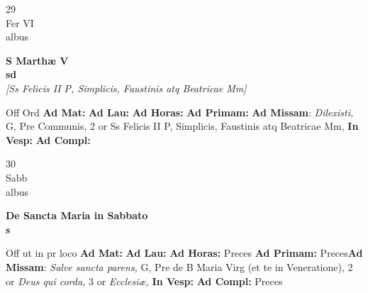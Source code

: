 \documentclass[10pt, openany]{book}
\begin{document}
    \begin{center}
        \begin{minipage}{3.5in}
            \vspace{2em}
            \begin{minipage}{0.5in}
                {\Huge 29} \\
                {\normalsize Fer VI} \\
                {\normalsize albus}
            \end{minipage}
            \begin{minipage}{3.0in}
                \textbf{ \large S Marthæ V \\
                \textnormal{\normalsize sd}} \\ \textit{[Ss Felicis II P, Simplicis, Faustinis atq Beatricae Mm]} \\ 
            \end{minipage}
            \begin{justify}Off Ord
                \textbf{Ad Mat: }
                \textbf{Ad Lau: }
                \textbf{Ad Horas: }
                \textbf{Ad Primam: }\textbf{Ad Missam}: \textit{Dilexisti,} G, Pre Communis, 2 or Ss Felicis II P, Simplicis, Faustinis atq Beatricae Mm,  
                \textbf{In Vesp: }
                \textbf{Ad Compl: }
            \end{justify}
        \end{minipage}
    \end{center}

    \begin{center}
        \begin{minipage}{3.5in}
            \vspace{2em}
            \begin{minipage}{0.5in}
                {\Huge 30} \\
                {\normalsize Sabb} \\
                {\normalsize albus}
            \end{minipage}
            \begin{minipage}{3.0in}
                \textbf{ \large De Sancta Maria in Sabbato \\
                \textnormal{\normalsize s}} \\ 
            \end{minipage}
            \begin{justify}Off ut in pr loco
                \textbf{Ad Mat: }
                \textbf{Ad Lau: }
                \textbf{Ad Horas: }Preces
                \textbf{Ad Primam: }Preces\textbf{Ad Missam}: \textit{Salve sancta parens,} G, Pre de B Maria Virg (et te in Veneratione), 2 or \textit{Deus qui corda,} 3 or \textit{Ecclesiæ,}  
                \textbf{In Vesp: }
                \textbf{Ad Compl: }Preces
            \end{justify}
        \end{minipage}
    \end{center}
\end{document}
